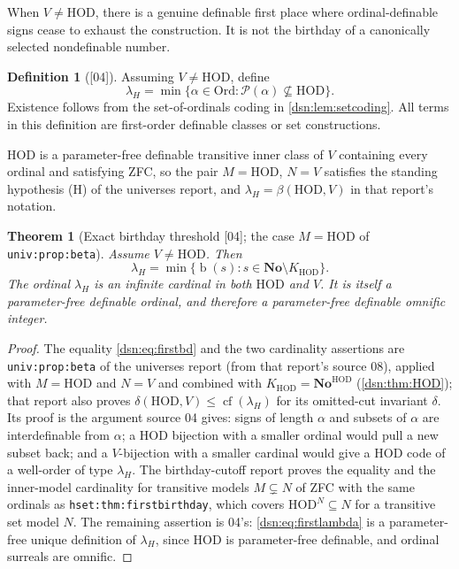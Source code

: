 \documentclass[11pt,a4paper]{article}
\numberwithin{equation}{section}
\newtheorem{theorem}{Theorem}[section]
\theoremstyle{definition}
\newtheorem{definition}[definition]{Definition}
\theoremstyle{remark}
\newcommand{\No}{\mathbf{No}}
\newcommand{\Ord}{\mathrm{Ord}}
\newcommand{\HOD}{\mathrm{HOD}}
\newcommand{\bd}{\operatorname{b}}
\newcommand{\KH}{K_{\HOD}}
\newcommand{\src}[1]{\textup{\textsf{\small[#1]}}}
\newcommand{\lbl}[1]{\nolinkurl{#1}}
\begin{document}
When $V\ne\HOD$, there is a genuine definable first place where
ordinal-definable signs cease to exhaust the construction. It is
not the birthday of a canonically selected nondefinable number.

\begin{definition}[\src{04}]
Assuming $V\ne\HOD$, define
\begin{equation}\label{dsn:eq:firstlambda}
 \lambda_H=\min\{\alpha\in\Ord:
                 \mathcal P(\alpha)\nsubseteq\HOD\}.
\end{equation}
Existence follows from the set-of-ordinals coding in
\cref{dsn:lem:setcoding}. All terms in this definition are
first-order definable classes or set constructions.
\end{definition}

$\HOD$ is a parameter-free definable transitive inner class of $V$
containing every ordinal and satisfying ZFC, so the pair $M=\HOD$, $N=V$
satisfies the standing hypothesis (H) of the universes report, and
$\lambda_H=\beta(\HOD,V)$ in that report's notation.

\begin{theorem}[Exact birthday threshold \src{04}; the case $M=\HOD$ of \lbl{univ:prop:beta}]\label{dsn:thm:firstbirthday}
Assume $V\ne\HOD$. Then
\begin{equation}\label{dsn:eq:firstbd}
 \lambda_H=\min\{\bd(s):s\in\No\setminus\KH\}.
\end{equation}
The ordinal $\lambda_H$ is an infinite cardinal in both $\HOD$ and $V$.
It is itself a parameter-free definable ordinal, and therefore a
parameter-free definable omnific integer.
\end{theorem}
\begin{proof}
The equality \eqref{dsn:eq:firstbd} and the two cardinality assertions are
\lbl{univ:prop:beta} of the universes report
\cite{RepoUniv} (from that report's source 08), applied with $M=\HOD$ and
$N=V$ and combined with $\KH=\No^{\HOD}$ (\cref{dsn:thm:HOD}); that report
also proves $\delta(\HOD,V)\le\operatorname{cf}(\lambda_H)$ for its
omitted-cut invariant $\delta$. Its proof is the argument source 04 gives:
signs of length $\alpha$ and subsets of $\alpha$ are interdefinable from
$\alpha$; a $\HOD$ bijection with a smaller ordinal would pull a new subset
back; and a $V$-bijection with a smaller cardinal would give a $\HOD$ code
of a well-order of type $\lambda_H$. The birthday-cutoff report proves the
equality and the inner-model cardinality for transitive models $M\subsetneq N$
of ZFC with the same ordinals as \lbl{hset:thm:firstbirthday}, which covers
$\HOD^N\subseteq N$ for a transitive set model $N$. The remaining assertion is 04's:
\eqref{dsn:eq:firstlambda} is a parameter-free unique definition of
$\lambda_H$, since $\HOD$ is parameter-free definable, and ordinal surreals
are omnific.
\end{proof}
\end{document}
